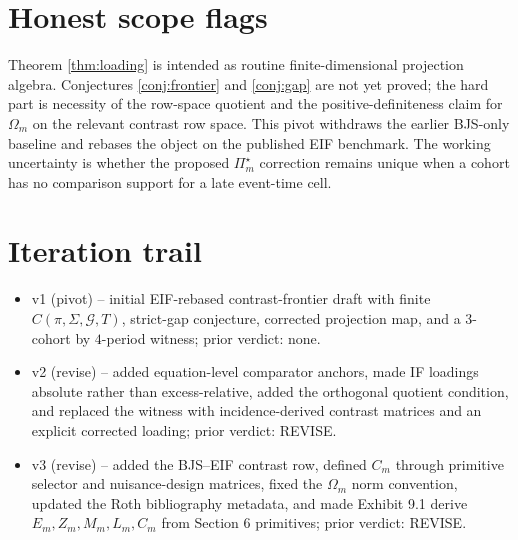 \documentclass[11pt]{article}
\theoremstyle{definition}
\theoremstyle{plain}
\theoremstyle{remark}
\begin{document}
\section{Honest scope flags}
Theorem \ref{thm:loading} is intended as routine finite-dimensional
projection algebra.  Conjectures \ref{conj:frontier} and \ref{conj:gap} are
not yet proved; the hard part is necessity of the row-space quotient and the
positive-definiteness claim for $\Omega_m$ on the relevant contrast row space.
This pivot withdraws the earlier BJS-only baseline and rebases the object on
the published EIF benchmark.  The working uncertainty is whether the proposed
$\Pi_m^\star$ correction remains unique when a cohort has no comparison
support for a late event-time cell.

\section{Iteration trail}
\begin{itemize}[leftmargin=*]
\item v1 (pivot) -- initial EIF-rebased contrast-frontier draft with finite
$C(\pi,\Sigma,\mathcal G,T)$, strict-gap conjecture, corrected projection
map, and a $3$-cohort by $4$-period witness; prior verdict: none.
\item v2 (revise) -- added equation-level comparator anchors, made IF loadings
absolute rather than excess-relative, added the orthogonal quotient condition,
and replaced the witness with incidence-derived contrast matrices and an
explicit corrected loading; prior verdict: REVISE.
\item v3 (revise) -- added the BJS--EIF contrast row, defined $C_m$ through
primitive selector and nuisance-design matrices, fixed the $\Omega_m$ norm
convention, updated the Roth bibliography metadata, and made Exhibit 9.1
derive $E_m,Z_m,M_m,L_m,C_m$ from Section 6 primitives; prior verdict: REVISE.
\end{itemize}
\end{document}
